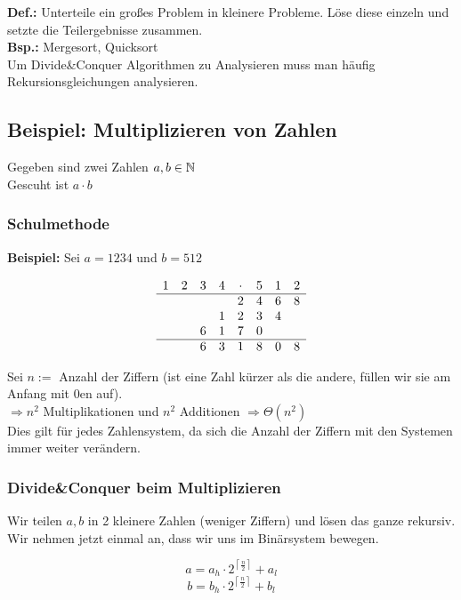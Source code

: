 \textbf{Def.:} Unterteile ein großes Problem in kleinere Probleme. Löse diese einzeln und setzte die Teilergebnisse zusammen.\\

\textbf{Bsp.:} Mergesort, Quicksort\\

Um Divide\&Conquer Algorithmen zu Analysieren muss man häufig Rekursionsgleichungen analysieren.

\subsection{Beispiel: Multiplizieren von Zahlen}

Gegeben sind zwei Zahlen $a,b \in \mathbb{N}$\\
Gescuht ist $ a \cdot b$

\subsubsection{Schulmethode}

\textbf{Beispiel:} Sei $a=1234$ und $b = 512$

$$
\begin{array}{cccccccc}
1 & 2 & 3 & 4 & \cdot & 5 & 1 & 2\\
\hline
&&&&2&4&6&8\\
&&&1&2&3&4&\\
&&6&1&7&0&&\\
\hline
&&6&3&1&8&0&8
\end{array}
$$

Sei $n := $ Anzahl der Ziffern (ist eine Zahl kürzer als die andere, füllen wir sie am Anfang mit 0en auf).\\
$\Rightarrow n^2$ Multiplikationen und $n^2$ Additionen $\Rightarrow \Theta (n^2)$\\

Dies gilt für jedes Zahlensystem, da sich die Anzahl der Ziffern mit den Systemen immer weiter verändern.\\

\subsubsection{Divide\&Conquer beim Multiplizieren}

Wir teilen $a,b$ in 2 kleinere Zahlen (weniger Ziffern) und lösen das ganze rekursiv. Wir nehmen jetzt einmal an, dass wir uns im Binärsystem bewegen.

$$
a = a_h \cdot 2^{\left\lceil \frac{n}{2} \right\rceil} + a_l
$$
$$
b = b_h \cdot 2^{\left\lceil \frac{n}{2} \right\rceil} + b_l
$$

